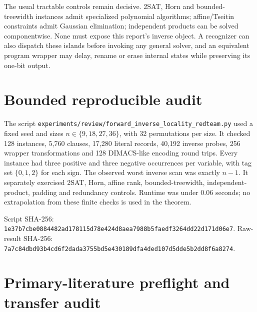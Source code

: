 \documentclass[11pt]{article}
\begin{document}
The usual tractable controls remain decisive.  2SAT, Horn and bounded-
treewidth instances admit specialized polynomial algorithms; affine/Tseitin
constraints admit Gaussian elimination; independent products can be solved
componentwise.  None must expose this report's inverse object.  A recognizer
can also dispatch these islands before invoking any general solver, and an
equivalent program wrapper may delay, rename or erase internal states while
preserving its one-bit output.

\section{Bounded reproducible audit}

The script
\texttt{experiments/review/forward\_inverse\_locality\_redteam.py} used a
fixed seed and sizes $n\in\{9,18,27,36\}$, with 32 permutations per size.
It checked 128 instances, 5,760 clauses, 17,280 literal records, 40,192
inverse probes, 256 wrapper transformations and 128 DIMACS-like encoding
round trips.  Every instance had three positive and three negative
occurrences per variable, with tag set $\{0,1,2\}$ for each sign.  The
observed worst inverse scan was exactly $n-1$.  It separately exercised
2SAT, Horn, affine rank, bounded-treewidth, independent-product, padding and
redundancy controls.  Runtime was under $0.06$ seconds; no extrapolation from
these finite checks is used in the theorem.

Script SHA-256:
\texttt{1e37b7cbe0884482ad178115d78e424d8aea7988b5faedf3264dd22d171d06e7}.
Raw-result SHA-256:
\texttt{7a7c84dbd93b4cd6f2dada3755bd5e430189dfa4ded107d5dde5b2dd8f6a8274}.

\section{Primary-literature preflight and transfer audit}
\end{document}
